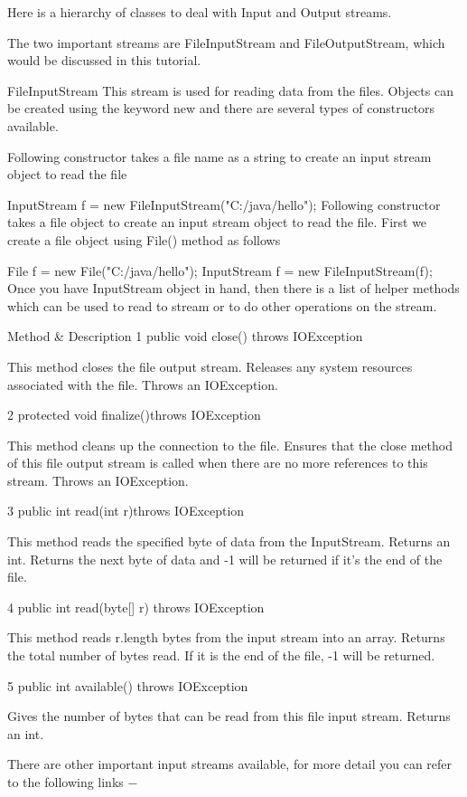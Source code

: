 Here is a hierarchy of classes to deal with Input and Output streams.



The two important streams are FileInputStream and FileOutputStream, which would be discussed in this tutorial.

FileInputStream
This stream is used for reading data from the files. Objects can be created using the keyword new and there are several types of constructors available.

Following constructor takes a file name as a string to create an input stream object to read the file

InputStream f = new FileInputStream("C:/java/hello");
Following constructor takes a file object to create an input stream object to read the file. First we create a file object using File() method as follows

File f = new File("C:/java/hello");
InputStream f = new FileInputStream(f);
Once you have InputStream object in hand, then there is a list of helper methods which can be used to read to stream or to do other operations on the stream.

 	Method & Description
1
public void close() throws IOException{}

This method closes the file output stream. Releases any system resources associated with the file. Throws an IOException.

2
protected void finalize()throws IOException {}

This method cleans up the connection to the file. Ensures that the close method of this file output stream is called when there are no more references to this stream. Throws an IOException.

3
 public int read(int r)throws IOException{}

This method reads the specified byte of data from the InputStream. Returns an int. Returns the next byte of data and -1 will be returned if it's the end of the file.

4
 public int read(byte[] r) throws IOException{}

This method reads r.length bytes from the input stream into an array. Returns the total number of bytes read. If it is the end of the file, -1 will be returned.

5
 public int available() throws IOException{}

Gives the number of bytes that can be read from this file input stream. Returns an int.

There are other important input streams available, for more detail you can refer to the following links −


